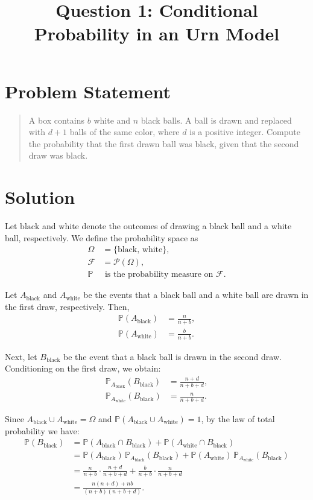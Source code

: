 \documentclass[12pt]{article}
\title{Question 1: Conditional Probability in an Urn Model}
\author{}
\date{}
\begin{document}
\maketitle
\onehalfspacing

\section*{Problem Statement}
\begin{quotation}
A box contains $b$ white and $n$ black balls. A ball is drawn and replaced with $d+1$ balls of the same color, where $d$ is a positive integer. Compute the probability that the first drawn ball was black, given that the second draw was black.
\end{quotation}

\section*{Solution}
Let $\mathrm{black}$ and $\mathrm{white}$ denote the outcomes of drawing a black ball and a white ball, respectively. We define the probability space as
\[
\begin{aligned}
\Omega &= \{\mathrm{black},\,\mathrm{white}\},\\[1mm]
\mathcal{F} &= \mathcal{P}(\Omega),\\[1mm]
\mathbb{P} &\text{ is the probability measure on } \mathcal{F}.
\end{aligned}
\]

Let $A_{\mathrm{black}}$ and $A_{\mathrm{white}}$ be the events that a black ball and a white ball are drawn in the first draw, respectively. Then,
\[
\begin{aligned}
\mathbb{P}(A_{\mathrm{black}}) &= \frac{n}{n+b},\\[1mm]
\mathbb{P}(A_{\mathrm{white}}) &= \frac{b}{n+b}.
\end{aligned}
\]

Next, let $B_{\mathrm{black}}$ be the event that a black ball is drawn in the second draw. Conditioning on the first draw, we obtain:
\[
\begin{aligned}
\mathbb{P}_{A_{\mathrm{black}}}(B_{\mathrm{black}}) &= \frac{n+d}{n+b+d},\\[1mm]
\mathbb{P}_{A_{\mathrm{white}}}(B_{\mathrm{black}}) &= \frac{n}{n+b+d}.
\end{aligned}
\]

Since $A_{\mathrm{black}} \cup A_{\mathrm{white}} = \Omega$ and $\mathbb{P}(A_{\mathrm{black}} \cup A_{\mathrm{white}})=1$, by the law of total probability we have:
\[
\begin{aligned}
\mathbb{P}(B_{\mathrm{black}}) &= \mathbb{P}(A_{\mathrm{black}} \cap B_{\mathrm{black}}) + \mathbb{P}(A_{\mathrm{white}} \cap B_{\mathrm{black}})\\[1mm]
&= \mathbb{P}(A_{\mathrm{black}})\,\mathbb{P}_{A_{\mathrm{black}}}(B_{\mathrm{black}}) + \mathbb{P}(A_{\mathrm{white}})\,\mathbb{P}_{A_{\mathrm{white}}}(B_{\mathrm{black}})\\[1mm]
&= \frac{n}{n+b}\cdot\frac{n+d}{n+b+d} + \frac{b}{n+b}\cdot\frac{n}{n+b+d}\\[1mm]
&= \frac{n(n+d) + nb}{(n+b)(n+b+d)}.
\end{aligned}
\]
\end{document}
